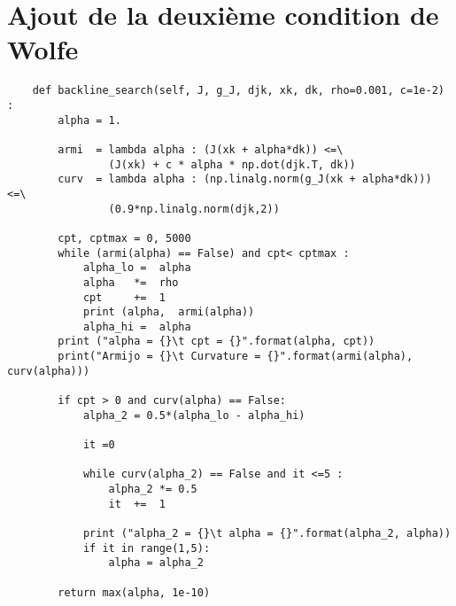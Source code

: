 \documentclass[a4paper,10pt]{article}
\numberwithin{equation}{section} %
\begin{document}
		
\pagebreak
		
		
\section{Ajout de la deuxième condition de Wolfe}
\begin{lstlisting}
    def backline_search(self, J, g_J, djk, xk, dk, rho=0.001, c=1e-2) :
        alpha = 1.
        
        armi  = lambda alpha : (J(xk + alpha*dk)) <=\
                (J(xk) + c * alpha * np.dot(djk.T, dk)) 
        curv  = lambda alpha : (np.linalg.norm(g_J(xk + alpha*dk))) <=\
                (0.9*np.linalg.norm(djk,2))  
        
        cpt, cptmax = 0, 5000
        while (armi(alpha) == False) and cpt< cptmax :
            alpha_lo =  alpha
            alpha   *=  rho
            cpt     +=  1
            print (alpha,  armi(alpha))
            alpha_hi =  alpha            
        print ("alpha = {}\t cpt = {}".format(alpha, cpt))
        print("Armijo = {}\t Curvature = {}".format(armi(alpha), curv(alpha)))
        
        if cpt > 0 and curv(alpha) == False:
            alpha_2 = 0.5*(alpha_lo - alpha_hi)
            
            it =0
            
            while curv(alpha_2) == False and it <=5 :
                alpha_2 *= 0.5        
                it  +=  1
            
            print ("alpha_2 = {}\t alpha = {}".format(alpha_2, alpha))            
            if it in range(1,5):
                alpha = alpha_2
                
        return max(alpha, 1e-10)
\end{lstlisting}
\end{document}
